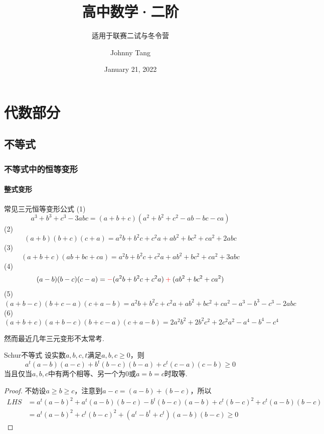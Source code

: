 \documentclass[lang=cn, zihao=4.5]{elegantbook}
\title{高中数学·二阶}
\subtitle{适用于联赛二试与冬令营}
\author{Johnny Tang}
\institute{DEEP Team}
\date{January 21, 2022}
\begin{document}
\maketitle

\frontmatter

\mainmatter

\tableofcontents

\newpage

\part{代数部分}

\chapter{不等式}

\section{不等式中的恒等变形}

\subsection{整式变形}

\begin{proposition}{常见三元恒等变形公式}
	(1)$$a^3+b^3+c^3-3abc = (a+b+c)(a^2+b^2+c^2-ab-bc-ca)$$
	(2)$$(a+b)(b+c)(c+a) = a^2b + b^2c + c^2a + ab^2 + bc^2 + ca^2 +2abc$$
	(3)$$(a+b+c)(ab+bc+ca) = a^2b + b^2c + c^2a + ab^2 + bc^2 + ca^2 +3abc$$
	(4)$$(a-b)(b-c)(c-a) = \color{red}-\color{black}(a^2b+b^2c+c^2a)\color{red}+\color{black}(ab^2+bc^2+ca^2)$$
	(5)$$(a+b-c)(b+c-a)(c+a-b) = a^2b+b^2c+c^2a+ab^2+bc^2+ca^2-a^3-b^3-c^3-2abc$$
	(6)$$(a+b+c)(a+b-c)(b+c-a)(c+a-b) = 2a^2b^2 + 2b^2c^2 + 2c^2a^2 - a^4 -b^4-c^4$$
\end{proposition}

然而最近几年三元变形不太常考.

\begin{theorem}{Schur不等式}
	设实数$a,b,c,t$满足$a,b,c \geq 0$，则$$a^t(a-b)(a-c) + b^t(b-c)(b-a) + c^t(c-a)(c-b) \geq 0$$
	当且仅当$a,b,c$中有两个相等、另一个为$0$或$a=b=c$时取等.
\end{theorem}
\begin{proof}
	不妨设$a \geq b \geq c$，注意到$a-c=(a-b)+(b-c)$，所以
	\begin{align*}
		LHS &= a^t(a-b)^2 + a^t(a-b)(b-c) - b^t(b-c)(a-b) + c^t(b-c)^2 + c^t(a-b)(b-c) \\
		&= a^t(a-b)^2 + c^t(b-c)^2 + (a^t-b^t+c^t)(a-b)(b-c) \geq 0
	\end{align*}
\end{proof}
\end{document}
